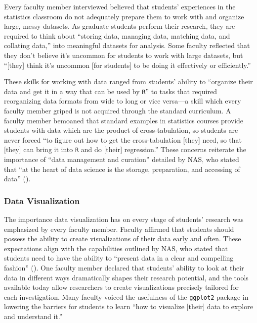 \documentclass[12pt]{article}
\begin{document}
\noindent Every faculty member interviewed believed that students' experiences in
the statistics classroom do not adequately prepare them to work with and
organize large, messy datasets. As graduate students perform their research,
they are required to think about ``storing data, managing data, matching
data, and collating data,'' into meaningful datasets for analysis. Some 
faculty reflected that they don't believe it's uncommon for students to work
with large datasets, but ``[they] think it's uncommon [for students] to be doing
it effectively or efficiently.'' 

\quad These skills for working with data ranged from students' ability to 
``organize their data and get it in a way that can be used by \texttt{R}'' to 
tasks that required reorganizing data formats from wide to long or vice 
versa---a skill which every faculty member griped is not acquired through the
standard curriculum. A faculty member bemoaned that standard examples in
statistics courses provide students with data which are the product
of cross-tabulation, so students are never forced ``to figure out how to get the
cross-tabulation [they] need, so that [they] can bring it into \texttt{R} and do
[their] regression.'' These concerns reiterate the importance of ``data
management and curation'' detailed by NAS, who stated that ``at the heart of
data science is the storage, preparation, and accessing of data'' 
(\citeyear[p.\ 26]{nas}). 

\subsubsection{Data Visualization} 

\noindent The importance data visualization has on every stage of students'
research was emphasized by every faculty member. Faculty affirmed
that students should possess the ability to create visualizations of their data
early and often. These expectations align with the capabilities outlined by
NAS, who stated that students need to have the ability to ``present data in a
clear and compelling fashion'' (\citeyear[p.\ 26]{nas}). One faculty member
declared that students' ability to look at their data in different ways
dramatically shapes their research potential, and the tools available today
allow researchers to create visualizations precisely tailored for each
investigation. Many faculty voiced the usefulness of the \texttt{ggplot2} 
package \citep{ggplot} in lowering the barriers for students to learn ``how to
visualize [their] data to explore and understand it.'' 
\end{document}
